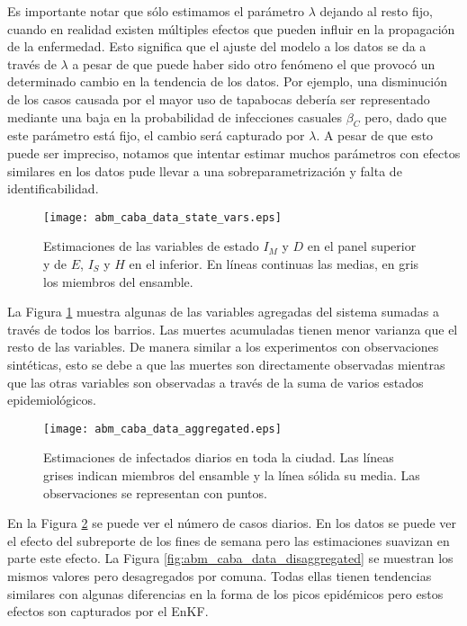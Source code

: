 Es importante notar que sólo estimamos el parámetro $\lambda$ dejando al resto fijo, cuando en realidad existen múltiples efectos que pueden influir en la propagación de la enfermedad. Esto significa que el ajuste del modelo a los datos se da a través de $\lambda$ a pesar de que puede haber sido otro fenómeno el que provocó un determinado cambio en la tendencia de los datos. Por ejemplo, una disminución de los casos causada por el mayor uso de tapabocas debería ser representado mediante una baja en la probabilidad de infecciones casuales $\beta_C$ pero, dado que este parámetro está fijo, el cambio será capturado por $\lambda$. A pesar de que esto puede ser impreciso, notamos que intentar estimar muchos parámetros con efectos similares en los datos pude llevar a una sobreparametrización y falta de identificabilidad.
\begin{figure}[h]
    \centering
    \texttt{[image: abm\_caba\_data\_state\_vars.eps]}
    \caption{Estimaciones de las variables de estado $I_M$ y $D$ en el panel superior y de $E$, $I_S$ y $H$ en el inferior. En líneas continuas las medias, en gris los miembros del ensamble.}
    \label{fig:abm_caba_data_state_vars}
\end{figure}

La Figura \ref{fig:abm_caba_data_state_vars} muestra algunas de las variables agregadas del sistema sumadas a través de todos los barrios. Las muertes acumuladas tienen menor varianza que el resto de las variables. De manera similar a los experimentos con observaciones sintéticas, esto se debe a que las muertes son directamente observadas mientras que las otras variables son observadas a través de la suma de varios estados epidemiológicos.
\begin{figure}[h]
    \centering
    \texttt{[image: abm\_caba\_data\_aggregated.eps]}
    \caption{Estimaciones de infectados diarios en toda la ciudad. Las líneas grises indican miembros del ensamble y la línea sólida su media. Las observaciones se representan con puntos.}
    \label{fig:abm_caba_data_aggregated}
\end{figure}

En la Figura \ref{fig:abm_caba_data_aggregated} se puede ver el número de casos diarios. En los datos se puede ver el efecto del subreporte de los fines de semana pero las estimaciones suavizan en parte este efecto. La Figura \ref{fig:abm_caba_data_disaggregated} se muestran los mismos valores pero desagregados por comuna. Todas ellas tienen tendencias similares con algunas diferencias en la forma de los picos epidémicos pero estos efectos son capturados por el EnKF.

